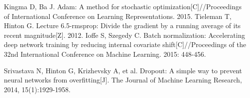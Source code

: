 \documentclass[withoutpreface,bwprint]{cumcmthesis} %
\begin{document}
%
\begin{thebibliography}{99}
	 Kingma D, Ba J. Adam: A method for stochastic optimization[C]//Proceedings of International
	Conference on Learning Representations. 2015.
%	
	 Tieleman T, Hinton G. Lecture 6.5-rmsprop: Divide the gradient by a running average of its recent magnitude[Z]. 2012.
%	
	 Ioffe S, Szegedy C. Batch normalization: Accelerating deep network training by reducing internal covariate shift[C]//Proceedings of the 32nd International Conference on Machine Learning. 2015:
	448-456.
	
	 Srivastava N, Hinton G, Krizhevsky A, et al. Dropout: A simple way to prevent neural networks
	from overfitting[J]. The Journal of Machine Learning Research, 2014, 15(1):1929-1958.
\end{thebibliography}
\end{document}
